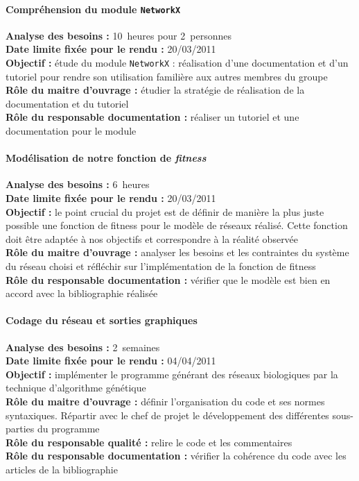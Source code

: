 \paragraph*{Compréhension du module \verb?NetworkX?\\}
\textbf{Analyse des besoins :} 10~heures pour 2~personnes\\
\textbf{Date limite fixée pour le rendu :} 20/03/2011\\
\textbf{Objectif :} étude du module \verb?NetworkX? : réalisation d'une documentation et d'un tutoriel pour rendre son utilisation familière aux autres membres du groupe\\
\textbf{Rôle du maitre d'ouvrage : }étudier la stratégie de réalisation de la documentation et du tutoriel\\
\textbf{Rôle du responsable documentation : }réaliser un tutoriel et une documentation pour le module

\paragraph*{Modélisation de notre fonction de \textit{fitness}\\}
\textbf{Analyse des besoins : }6~heures\\
\textbf{Date limite fixée pour le rendu :} 20/03/2011\\
\textbf{Objectif : }le point crucial du projet est de définir de manière la plus juste possible une fonction de fitness pour le modèle de réseaux réalisé. Cette fonction doit être adaptée à nos objectifs et correspondre à la réalité observée\\
\textbf{Rôle du maitre d'ouvrage : }analyser les besoins et les contraintes du système du réseau choisi et réfléchir sur l'implémentation de la fonction de fitness\\
\textbf{Rôle du responsable documentation : }vérifier que le modèle est bien en accord avec la bibliographie réalisée

\paragraph*{Codage du réseau et sorties graphiques\\}
\textbf{Analyse des besoins : }2~semaines\\
\textbf{Date limite fixée pour le rendu : }04/04/2011\\
\textbf{Objectif : }implémenter le programme générant des réseaux biologiques par la technique d'algorithme génétique\\
\textbf{Rôle du maitre d'ouvrage : }définir l'organisation du code et ses normes syntaxiques. Répartir avec le chef de projet le développement des différentes sous-parties du programme\\
\textbf{Rôle du responsable qualité : }relire le code et les commentaires\\
\textbf{Rôle du responsable documentation : }vérifier la cohérence du code avec les articles de la bibliographie

